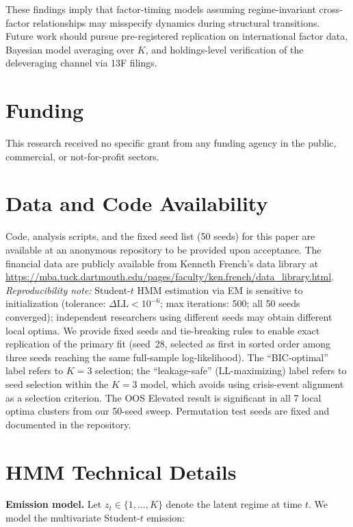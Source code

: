 \documentclass[sigconf,anonymous]{acmart}
\begin{document}
These findings imply that factor-timing models assuming regime-invariant
cross-factor relationships may misspecify dynamics during structural
transitions. Future work should pursue pre-registered replication on
international factor data, Bayesian model averaging over $K$, and
holdings-level verification of the deleveraging channel via 13F filings.

\section*{Funding}

This research received no specific grant from any funding agency in the public,
commercial, or not-for-profit sectors.

\section*{Data and Code Availability}

Code, analysis scripts, and the fixed seed list (50 seeds) for this paper are available at an anonymous repository to be provided upon acceptance. The financial data are publicly available from Kenneth French's data library at \url{https://mba.tuck.dartmouth.edu/pages/faculty/ken.french/data_library.html}. \emph{Reproducibility note:} Student-$t$ HMM estimation via EM is sensitive to initialization (tolerance: $\Delta\text{LL} < 10^{-6}$; max iterations: 500; all 50 seeds converged); independent researchers using different seeds may obtain different local optima. We provide fixed seeds and tie-breaking rules to enable exact replication of the primary fit (seed~28, selected as first in sorted order among three seeds reaching the same full-sample log-likelihood). The ``BIC-optimal'' label refers to $K = 3$ selection; the ``leakage-safe'' (LL-maximizing) label refers to seed selection within the $K = 3$ model, which avoids using crisis-event alignment as a selection criterion. The OOS Elevated result is significant in all 7 local optima clusters from our 50-seed sweep. Permutation test seeds are fixed and documented in the repository.

\appendix

\section{HMM Technical Details}
\label{app:hmm_details}

\textbf{Emission model.}
Let $z_t \in \{1, \ldots, K\}$ denote the latent regime at time $t$. We model the multivariate Student-$t$ emission:
\end{document}

